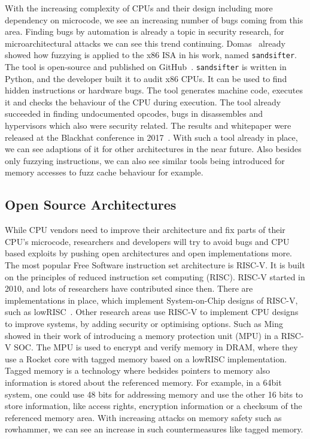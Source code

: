 With the increasing complexity of CPUs and their design including more
dependency on microcode, we see an increasing number of bugs coming from this
area. Finding bugs by automation is already a topic in security research, for
microarchitectural attacks we can see this trend continuing.
Domas~\cite{sandsifter} already showed how fuzzying is applied to the x86 ISA in
his work, named \texttt{sandsifter}. The tool is open-source and published on
GitHub~\cite{sandsifterurl}. \texttt{sandsifter} is written in Python, and the
developer built it to audit x86 CPUs. It can be used to find hidden instructions
or hardware bugs. The tool generates machine code, executes it and checks the
behaviour of the CPU during execution. The tool already succeeded in finding
undocumented opcodes, bugs in disassembles and hypervisors which also were
security related. The results and whitepaper were released at the Blackhat
conference in 2017~\cite{sandsifter}. With such a tool already in place, we can
see adaptions of it for other architectures in the near future. Also besides
only fuzzying instructions, we can also see similar tools being introduced for
memory accesses to fuzz cache behaviour for example.

\subsection{Open Source Architectures}

While CPU vendors need to improve their architecture and fix parts of their
CPU's microcode, researchers and developers will try to avoid bugs and CPU based
exploits by pushing open architectures and open implementations more. The most
popular Free Software instruction set architecture is RISC-V. It is built on the
principles of reduced instruction set computing (RISC). RISC-V started in 2010,
and lots of researchers have contributed since then. There are implementations
in place, which implement System-on-Chip designs of RISC-V, such as
lowRISC~\cite{lowrisc}. Other research areas use RISC-V  to implement CPU
designs to improve systems, by adding security or optimising options. Such as
Ming~\etal~\cite{smarts} showed in their work of introducing a memory protection
unit (MPU) in a RISC-V SOC. The MPU is used to encrypt and verify memory in
DRAM, where they use a Rocket core with tagged memory based on a lowRISC
implementation. Tagged memory is a technology where bedsides pointers to memory
also information is stored about the referenced memory. For example, in a 64bit
system, one could use 48 bits for addressing memory and use the other 16 bits to
store information, like access rights, encryption information or a checksum of
the referenced memory area. With increasing attacks on memory safety such as
rowhammer, we can see an increase in such countermeasures like tagged memory.

